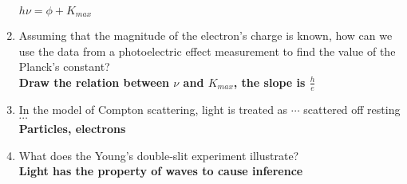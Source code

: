 \documentclass[a4paper]{article}
\begin{document}
\begin{enumerate}
    \\ \textbf{$h\nu=\phi+K_{max}$}
    \item Assuming that the magnitude of the electron’s charge is known, how can we use the data from a photoelectric effect measurement to find the value of the Planck’s constant?
    \\ \textbf{Draw the relation between $\nu$ and $K_{max}$, the slope is $\frac{h}{e}$}
    \item In the model of Compton scattering, light is treated as $\cdots$ scattered off resting $\cdots$
    \\ \textbf{Particles, electrons}
    \item What does the Young’s double-slit experiment illustrate?
    \\ \textbf{Light has the property of waves to cause inference}
\end{enumerate}
\end{document}
